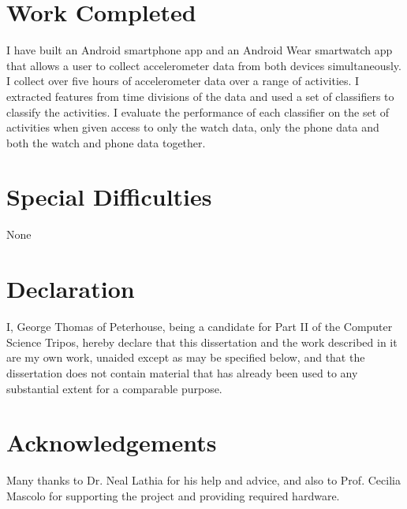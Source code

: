 \documentclass[12pt,a4paper,twoside,openright]{report}
\begin{document}
\section*{Work Completed}

  I have built an Android smartphone app and an Android Wear smartwatch app that allows a user to collect accelerometer data from both devices simultaneously. I collect over five hours of accelerometer data over a range of activities. I extracted features from time divisions of the data and used a set of classifiers to classify the activities. I evaluate the performance of each classifier on the set of activities when given access to only the watch data, only the phone data and both the watch and phone data together.

\section*{Special Difficulties}

None

\newpage
\section*{Declaration}

I, George Thomas of Peterhouse, being a candidate for Part II of the Computer
Science Tripos, hereby declare
that this dissertation and the work described in it are my own work,
unaided except as may be specified below, and that the dissertation
does not contain material that has already been used to any substantial
extent for a comparable purpose.

\bigskip
{}

\medskip
{}

\tableofcontents

\listoffigures

\newpage
\section*{Acknowledgements}

Many thanks to Dr. Neal Lathia for his help and advice, and also to Prof. Cecilia Mascolo for supporting the project and providing required hardware.


\pagestyle{headings}


\end{document}
